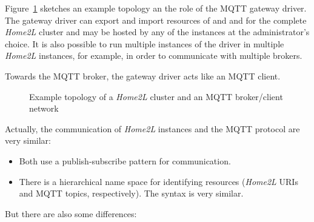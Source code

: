 \documentclass[12pt,english,parskip=half,headheight=19pt]{scrreprt}
\newcommand{\figsvg}[2][]{}            %
\newcommand{\figsvg}[2][]{\href{#2}{}} %
\begin{document}
Figure~\ref{fig:mqtt-topology} sketches an example topology an the role of the MQTT gateway driver.
The gateway driver can export and import resources of and and for the complete \textit{Home2L} cluster and may be hosted by any of the instances at the administrator's choice. It is also possible to run multiple instances of the driver in multiple \textit{Home2L} instances, for example, in order to communicate with multiple brokers.

Towards the MQTT broker, the gateway driver acts like an MQTT client.

\begin{figure}[ht]
  \centering
  \figsvg[width=0.9\linewidth]{figs/mqtt-topology.svg}
  \caption[l]{Example topology of a \textit{Home2L} cluster and an MQTT broker/client network}
  \label{fig:mqtt-topology}
\end{figure}





Actually, the communication of \textit{Home2L} instances and the MQTT protocol are very similar:
\begin{itemize}
  \item Both use a publish-subscribe pattern for communication.
  \item There is a hierarchical name space for identifying resources (\textit{Home2L} URIs and MQTT topics, respectively).
    The syntax is very similar.
\end{itemize}

But there are also some differences:
\end{document}
